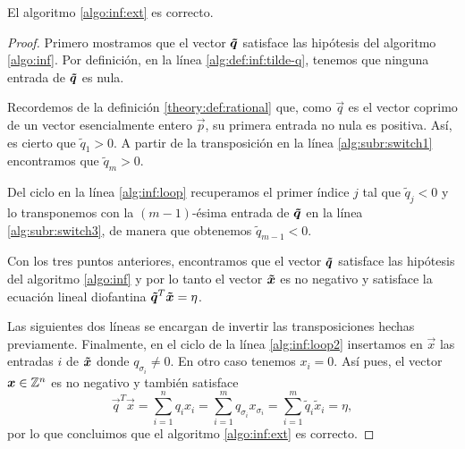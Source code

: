 \begin{theorem}
	\label{th:alg:inf}
	El algoritmo \ref{algo:inf:ext} es correcto.
\end{theorem}
\begin{proof}
	Primero mostramos que el vector $\boldsymbol{\tilde{q}}$ satisface las hipótesis del algoritmo
	\ref{algo:inf}. Por definición, en la línea \ref{alg:def:inf:tilde-q}, tenemos que ninguna
	entrada de $\boldsymbol{\tilde{q}}$ es nula.

	Recordemos de la definición \ref{theory:def:rational} que, como $\vec{q}$ es el vector coprimo
	de un vector esencialmente entero $\vec{p}$, su primera entrada no nula es positiva. Así, es
	cierto que $\tilde{q}_1 > 0$. A partir de la transposición en la línea \ref{alg:subr:switch1}
	encontramos que $\tilde{q}_m > 0$.

	Del ciclo en la línea \ref{alg:inf:loop} recuperamos el primer índice $j$ tal que $\tilde{q}_j < 0$ y
	lo transponemos con la $(m - 1)$-ésima entrada de $\boldsymbol{\tilde{q}}$ en la línea
	\ref{alg:subr:switch3}, de manera que obtenemos $\tilde{q}_{m-1} < 0$.

	Con los tres puntos anteriores, encontramos que el vector $\boldsymbol{\tilde{q}}$ satisface las
	hipótesis del algoritmo \ref{algo:inf} y por lo tanto el vector $\boldsymbol{\tilde{x}}$ es no negativo
	y satisface la ecuación lineal diofantina $\boldsymbol{\tilde{q}}^T\boldsymbol{\tilde{x}} = \eta$.

	Las siguientes dos líneas se encargan de invertir las transposiciones hechas previamente.
	Finalmente, en el ciclo de la línea \ref{alg:inf:loop2} insertamos en $\vec{x}$ las entradas $i$
	de $\boldsymbol{\tilde{x}}$ donde $q_{\sigma_i} \neq 0$. En otro caso tenemos $x_i = 0$. Así pues, el vector
	$\boldsymbol{x} \in \mathbb{Z}^n$ es no negativo y también satisface
	\begin{equation*}
		\vec{q}^T\vec{x} = \sum_{i = 1}^{n}q_ix_i
		= \sum_{i = 1}^{m}q_{\sigma_i}x_{\sigma_i}
		= \sum_{i = 1}^{m}\tilde{q}_i\tilde{x}_i
		= \eta,
	\end{equation*}
	por lo que concluimos que el algoritmo \ref{algo:inf:ext} es correcto.
\end{proof}

